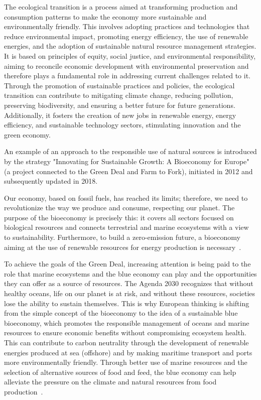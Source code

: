 The ecological transition is a process aimed at transforming production and consumption patterns to make the economy more sustainable and environmentally friendly. This involves adopting practices and technologies that reduce environmental impact, promoting energy efficiency, the use of renewable energies, and the adoption of sustainable natural resource management strategies. It is based on principles of equity, social justice, and environmental responsibility, aiming to reconcile economic development with environmental preservation and therefore plays a fundamental role in addressing current challenges related to it. Through the promotion of sustainable practices and policies, the ecological transition can contribute to mitigating climate change, reducing pollution, preserving biodiversity, and ensuring a better future for future generations. Additionally, it fosters the creation of new jobs in renewable energy, energy efficiency, and sustainable technology sectors, stimulating innovation and the green economy.

An example of an approach to the responsible use of natural sources is introduced by the strategy "Innovating for Sustainable Growth: A Bioeconomy for Europe" (a project connected to the Green Deal and Farm to Fork), initiated in 2012 and subsequently updated in 2018.

Our economy, based on fossil fuels, has reached its limits; therefore, we need to revolutionize the way we produce and consume, respecting our planet. The purpose of the bioeconomy is precisely this: it covers all sectors focused on biological resources and connects terrestrial and marine ecosystems with a view to sustainability. Furthermore, to build a zero-emission future, a bioeconomy aiming at the use of renewable resources for energy production is necessary~\parencite{eucommission_sustainable_2018}.

To achieve the goals of the Green Deal, increasing attention is being paid to the role that marine ecosystems and the blue economy can play and the opportunities they can offer as a source of resources. The Agenda 2030 recognizes that without healthy oceans, life on our planet is at risk, and without these resources, societies lose the ability to sustain themselves. This is why European thinking is shifting from the simple concept of the bioeconomy to the idea of a sustainable blue bioeconomy, which promotes the responsible management of oceans and marine resources to ensure economic benefits without compromising ecosystem health. This can contribute to carbon neutrality through the development of renewable energies produced at sea (offshore) and by making maritime transport and ports more environmentally friendly. Through better use of marine resources and the selection of alternative sources of food and feed, the blue economy can help alleviate the pressure on the climate and natural resources from food production~\parencite{sustainable_blue_economy_2021}.

